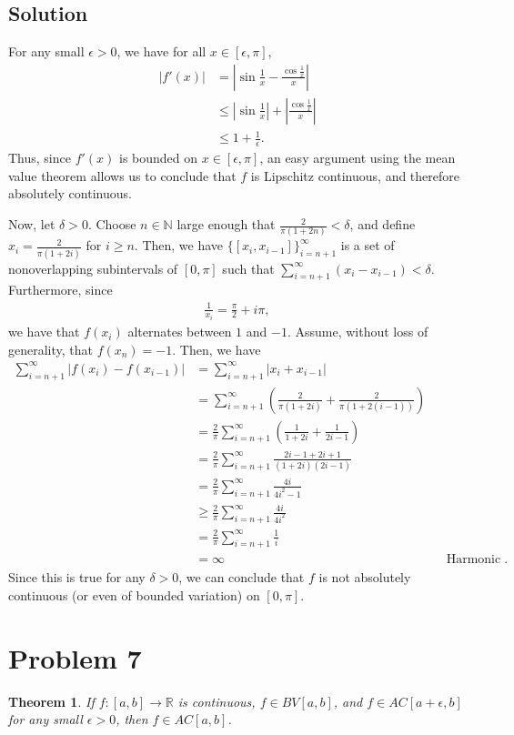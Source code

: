 \documentclass[10pt,a4paper]{article}
\theoremstyle{theorem}
\newtheorem{theorem}{Theorem}
\theoremstyle{definition}
\begin{document}
\subsection*{Solution}
For any small $\epsilon > 0$, we have for all $x \in [\epsilon, \pi]$,
\begin{align*}
|f'(x)| &= \left| \sin \frac{1}{x} - \frac{\cos\frac{1}{x}}{x} \right|\\
&\leq \left| \sin \frac{1}{x} \right| + \left| \frac{\cos\frac{1}{x}}{x} \right|\\
&\leq 1 + \frac{1}{\epsilon}.
\end{align*}
Thus, since $f'(x)$ is bounded on $x \in [\epsilon, \pi]$, an easy argument using the mean value theorem allows us to conclude that $f$ is Lipschitz continuous, and therefore absolutely continuous.

Now, let $\delta > 0$. Choose $n \in \mathbb{N}$ large enough that $\frac{2}{\pi (1 + 2n)} < \delta$, and define $x_i = \frac{2}{\pi (1 + 2i)}$ for $i \geq n$. Then, we have $\{[x_i, x_{i-1}] \}_{i=n + 1}^\infty$ is a set of nonoverlapping subintervals of $[0, \pi]$ such that $\sum_{i= n + 1}^\infty (x_i - x_{i-1}) < \delta$. Furthermore, since 
\begin{align*}
\frac{1}{x_i} = \frac{\pi}{2} + i \pi,
\end{align*}
we have that $f(x_i)$ alternates between $1$ and $-1$. Assume, without loss of generality, that $f(x_n) = -1$. Then, we have
\begin{align*}
\sum_{i=n + 1}^\infty |f(x_i) - f(x_{i-1})| &= \sum_{i=n + 1}^\infty |x_i + x_{i-1}|\\
&= \sum_{i=n + 1}^\infty \left(\frac{2}{\pi (1 + 2i)} + \frac{2}{\pi (1 + 2(i-1))} \right)\\
&= \frac{2}{\pi} \sum_{i=n + 1}^\infty \left(\frac{1}{1 + 2i} + \frac{1}{2i - 1} \right)\\
&= \frac{2}{\pi} \sum_{i=n + 1}^\infty \frac{2i - 1 + 2i + 1}{(1 + 2i)(2i - 1)} \\
&= \frac{2}{\pi} \sum_{i=n + 1}^\infty \frac{4i}{4i^2 - 1} \\
&\geq \frac{2}{\pi} \sum_{i=n + 1}^\infty \frac{4i}{4i^2} \\
&= \frac{2}{\pi} \sum_{i=n + 1}^\infty \frac{1}{i}\\
&= \infty && \text{Harmonic series does not converge}.
\end{align*}
Since this is true for any $\delta > 0$, we can conclude that $f$ is not absolutely continuous (or even of bounded variation) on $[0, \pi]$.

\section*{Problem 7}
\begin{theorem}
If $f:[a, b] \to \mathbb{R}$ is continuous, $f \in BV[a, b]$, and $f \in AC[a + \epsilon, b]$ for any small $\epsilon > 0$, then $f \in AC[a, b]$.
\end{theorem}
\end{document}
